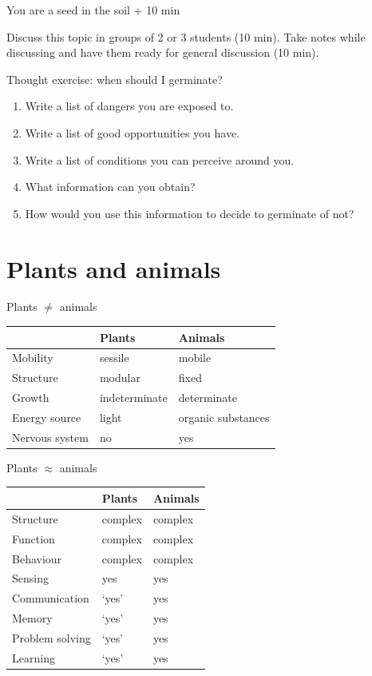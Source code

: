 \documentclass[10pt]{beamer}
\begin{document}
\begin{frame}{You are a seed in the soil  + 10 min}

Discuss this topic in groups of 2 or 3 students (10 min). Take notes while discussing and have them ready for general discussion (10 min).

\begin{alertblock}{Thought exercise: when should I germinate?}
\begin{enumerate}
  \item Write a list of dangers you are exposed to.
  \item Write a list of good opportunities you have.
  \item Write a list of conditions you can perceive around you.
  \item What information can you obtain?
  \item How would you use this information to decide to germinate of not?
\end{enumerate}
\end{alertblock}

\end{frame}

\section{Plants and animals}

\begin{frame}{Plants $\neq$ animals}

\center
\begin{tabular}{lll}
\hline
& \textbf{Plants} & \textbf{Animals}\\
\hline
Mobility & sessile & mobile\\
Structure & modular & fixed\\
Growth & indeterminate & determinate\\
Energy source & light & organic substances\\
Nervous system & no & yes\\
\hline
\end{tabular}
\end{frame}

\begin{frame}{Plants $\approx$ animals}

\center
\begin{tabular}{lll}
\hline
& \textbf{Plants} & \textbf{Animals}\\
\hline
Structure & complex & complex\\
Function & complex  & complex\\
Behaviour & complex & complex\\
Sensing & yes & yes\\
Communication & `yes' & yes\\
Memory & `yes' & yes\\
Problem solving & `yes' & yes\\
Learning & `yes' & yes\\
\hline
\end{tabular}
\end{frame}
\end{document}
